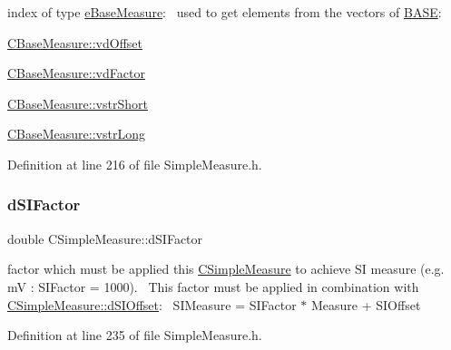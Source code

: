 index of type \hyperlink{BaseMeasure_8h_ac90e5164ccf1f0d648fba7e94b229a11}{e\+Base\+Measure}\+:~\newline
 used to get elements from the vectors of \hyperlink{BaseMeasure_8h_a79bcfb6bde984f42d1124b068a509af7}{B\+A\+SE}\+: 


\begin{DoxyItemize}
\item \hyperlink{classCBaseMeasure_a7220e3dfd4fbdd319a5c3c6af844259e}{C\+Base\+Measure\+::vd\+Offset}
\item \hyperlink{classCVectorHandle_af8f8b2e0da8363e695872ca85f33364e}{C\+Base\+Measure\+::vd\+Factor}
\item \hyperlink{classCVectorHandle_afb50c8a33d4cf70bf92c644dca409ea2}{C\+Base\+Measure\+::vstr\+Short}
\item \hyperlink{classCVectorHandle_a71bec0e385b9ca8e5ffa174b559da9f8}{C\+Base\+Measure\+::vstr\+Long} 
\end{DoxyItemize}

Definition at line 216 of file Simple\+Measure.\+h.

\mbox{\label{classCSimpleMeasure_a08be520f9d3a0e50cc63693f2fc607f2}} 
\subsubsection{\texorpdfstring{d\+S\+I\+Factor}{dSIFactor}}
{\footnotesize\ttfamily double C\+Simple\+Measure\+::d\+S\+I\+Factor\hspace{0.3cm}{\ttfamily [protected]}}



factor which must be applied this \hyperlink{classCSimpleMeasure}{C\+Simple\+Measure} to achieve SI measure (e.\+g. mV \+: S\+I\+Factor = 1000).~\newline
 This factor must be applied in combination with \hyperlink{classCSimpleMeasure_a27c1637c744a79856ee81869e2aa8890}{C\+Simple\+Measure\+::d\+S\+I\+Offset}\+:~\newline
 S\+I\+Measure = S\+I\+Factor $\ast$ Measure + S\+I\+Offset 



Definition at line 235 of file Simple\+Measure.\+h.

\mbox{\label{classCSimpleMeasure_a27c1637c744a79856ee81869e2aa8890}} 
